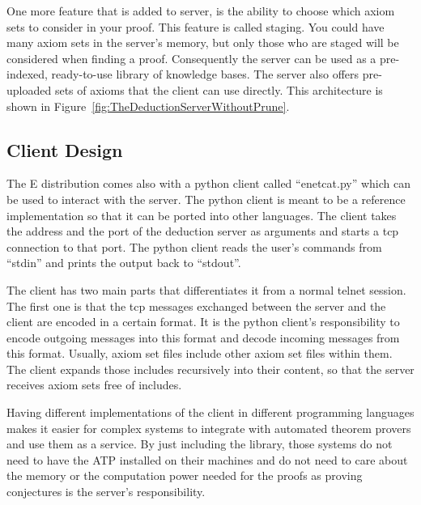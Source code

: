 
One more feature that is added to server, is the ability to choose which axiom sets to consider in your proof. This feature is called staging. You could have many axiom sets in the server's memory, but only those who are staged will be considered when finding a proof. Consequently the server can be used as a pre-indexed, ready-to-use library of knowledge bases. The server also offers pre-uploaded sets of axioms that the client can use directly. This architecture is shown in Figure~\ref{fig:TheDeductionServerWithoutPrune}.


\subsection{Client Design}
The E distribution comes also with a python client called ``enetcat.py'' which can be used to interact with the server. The python client is meant to be a reference implementation so that it can be ported into other languages. The client takes the address and the port of the deduction server as arguments and starts a \ac{tcp} connection to that port. The python client reads the user's commands from ``stdin'' and prints the output back to ``stdout''.

The client has two main parts that differentiates it from a normal telnet session. The first one is that the \ac{tcp} messages exchanged between the server and the client are encoded in a certain format. It is the python client's responsibility to encode outgoing messages into this format and decode incoming messages from this format. Usually, axiom set files include other axiom set files within them. The client expands those includes recursively into their content, so that the server receives axiom sets free of includes.

Having different implementations of the client in different programming languages makes it easier for complex systems to integrate with automated theorem provers and use them as a service. By just including the library, those systems do not need to have the ATP installed on their machines and do not need to care about the memory or the computation power needed for the proofs as proving conjectures is the server's responsibility.

